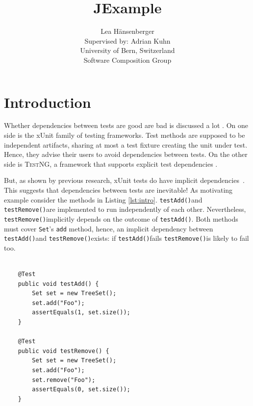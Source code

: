 \documentclass[11pt,a4paper,pdftex]{article}
\newcommand{\TestNG}{\textsc{TestNG}\xspace}
\newcommand{\ttt}[1]{\texttt{#1}}
\newcommand{\testAdd}{\ttt{testAdd()}}
\newcommand{\testRemove}{\ttt{testRemove()}}
\begin{document}
\title{JExample}

\author{Lea H\"ansenberger\\
	Supervised by: Adrian Kuhn\\
	University of Bern, Switzerland\\
	Software Composition Group
}

\maketitle

\begin{abstract}

\end{abstract}

\section{Introduction}

\lstset{language=Java}

Whether dependencies between tests are good are bad is discussed a lot \cite{Deur01a,Fews99a,Mesz07a}.
On one side is the xUnit family of testing frameworks. Test methods are supposed to be independent artifacts, sharing at most a test fixture creating the unit under test. Hence, they advise their users to avoid dependencies between tests.
On the other side is \TestNG, a framework that supports explicit test dependencies \cite{Bues07a}.

But, as shown by previous research, xUnit tests do have implicit dependencies\ \cite{Gael04c}.
This suggests that dependencies between tests are inevitable!
As motivating example consider the methods in Listing \ref{lst:intro}. \testAdd and \testRemove are implemented to run independently of each other. Nevertheless, \testRemove implicitly depends on the outcome of \testAdd. Both methods must cover \ttt{Set}'s \ttt{add} method, hence, an implicit dependency between \testAdd and \testRemove exists: if \testAdd fails \testRemove is likely to fail too.

\begin{lstlisting}[label=lst:intro,caption=Implicit dependency between test methods.]
    
    @Test
    public void testAdd() {
    	Set set = new TreeSet();
        set.add("Foo");
        assertEquals(1, set.size());
    }

    @Test
    public void testRemove() {
    	Set set = new TreeSet();
        set.add("Foo");
        set.remove("Foo");
        assertEquals(0, set.size());
    }
\end{lstlisting}
\end{document}

